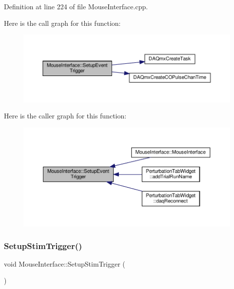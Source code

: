 Definition at line 224 of file Mouse\+Interface.\+cpp.

Here is the call graph for this function\+:
\nopagebreak
\begin{figure}[H]
\begin{center}
\leavevmode
\includegraphics[width=350pt]{class_mouse_interface_a6f60ced71ed9ac307b019cb300e44a32_cgraph}
\end{center}
\end{figure}
Here is the caller graph for this function\+:
\nopagebreak
\begin{figure}[H]
\begin{center}
\leavevmode
\includegraphics[width=350pt]{class_mouse_interface_a6f60ced71ed9ac307b019cb300e44a32_icgraph}
\end{center}
\end{figure}
\mbox{\label{class_mouse_interface_a913cdae50fddc45ee67131d762735dbc}} 
\subsubsection{\texorpdfstring{Setup\+Stim\+Trigger()}{SetupStimTrigger()}}
{\footnotesize\ttfamily void Mouse\+Interface\+::\+Setup\+Stim\+Trigger (\begin{DoxyParamCaption}{ }\end{DoxyParamCaption})}



